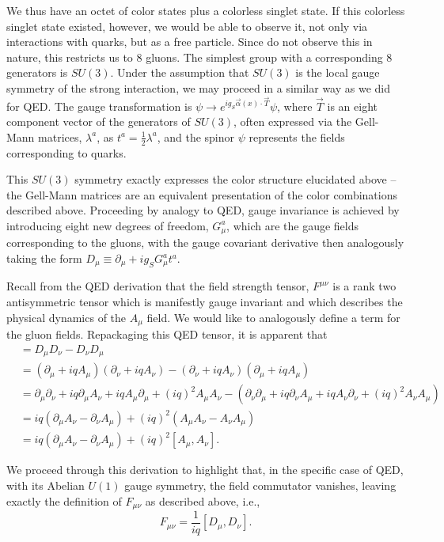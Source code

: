 We thus have an octet of color states plus a colorless singlet state. If this colorless singlet state 
existed, however, we would be able to observe it, not only via interactions with quarks, but as a free
particle. Since do not observe this in nature, this restricts us to $8$ gluons. The simplest group with 
a corresponding 8 generators is $SU(3)$. Under the assumption that $SU(3)$ is the local gauge symmetry
of the strong interaction, we may proceed in a similar way as we did for QED. The gauge transformation is 
$\psi \rightarrow e^{ig_{S}\vec{\alpha}(x)\cdot \vec{T}}\psi$, where $\vec{T}$ is an eight component vector
of the generators of $SU(3)$, often expressed via the Gell-Mann matrices, $\lambda^{a}$, as $t^{a} = \frac{1}{2}\lambda^{a}$,
and the spinor $\psi$ represents the fields corresponding to quarks.

This $SU(3)$ symmetry exactly expresses the color structure elucidated above -- the Gell-Mann matrices are an 
equivalent presentation of the color combinations described above. Proceeding by analogy to QED, gauge invariance 
is achieved by introducing eight new degrees of freedom, $G_{\mu}^{a}$, which are the gauge fields corresponding to 
the gluons, with the gauge covariant derivative then analogously taking the form 
$D_{\mu} \equiv \partial_{\mu} + ig_{S}G_{\mu}^{a}t^{a}$.

Recall from the QED derivation that the field strength tensor, $F^{\mu\nu}$ is a rank two antisymmetric
tensor which is manifestly gauge invariant and which describes the physical dynamics of the $A_{\mu}$ field.
We would like to analogously define a term for the gluon fields. Repackaging this QED tensor, it is apparent that
\begin{align}
[D_{\mu}, D_{\nu}] &= D_{\mu}D_{\nu} - D_{\nu}D_{\mu}\\
&= (\partial_{\mu} + iqA_{\mu})(\partial_{\nu} + iqA_{\nu}) - (\partial_{\nu} + iqA_{\nu})(\partial_{\mu} + iqA_{\mu})\\
&= \partial_{\mu}\partial_{\nu}+iq\partial_{\mu}A_{\nu} + iqA_{\mu}\partial_{\mu} + (iq)^2A_{\mu}A_{\nu} -
(\partial_{\nu}\partial_{\mu}+iq\partial_{\nu}A_{\mu} + iqA_{\nu}\partial_{\nu} + (iq)^2A_{\nu}A_{\mu})\\
&=iq(\partial_{\mu}A_{\nu}-\partial_{\nu}A_{\mu}) + (iq)^2(A_{\mu}A_{\nu}-A_{\nu}A_{\mu})\\
&=iq(\partial_{\mu}A_{\nu}-\partial_{\nu}A_{\mu})+(iq)^2[A_{\mu}, A_{\nu}].
\end{align}

We proceed through this derivation to highlight that, in the specific case of QED, with its Abelian $U(1)$ gauge
symmetry, the field commutator vanishes, leaving exactly the definition of $F_{\mu\nu}$ as described above, i.e.,
\begin{equation}
F_{\mu\nu} = \frac{1}{iq}[D_{\mu}, D_{\nu}].
\end{equation}


